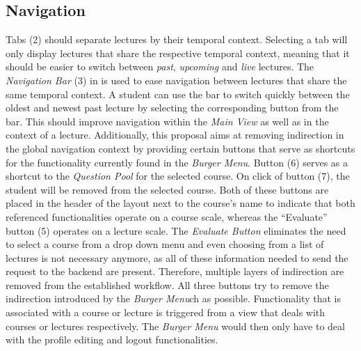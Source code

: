 \subsection{Navigation}
\label{section:con:proposals:mainview:navigation}
Tabs (2) should separate lectures by their temporal context. Selecting a tab will only display lectures that share the respective temporal context, meaning that it should be easier to switch between \emph{past}, \emph{upcoming} and \emph{live} lectures.
The \emph{Navigation Bar} (3) in  is used to ease navigation between lectures that share the same temporal context. A student can use the bar to switch quickly between the oldest and newest past lecture by selecting the corresponding button from the bar. This should improve navigation within the \emph{Main View} as well as in the context of a lecture. 
Additionally, this proposal aims at removing indirection in the global navigation context by providing certain buttons that serve as shortcuts for the functionality currently found in the \emph{Burger Menu}. Button (6) serves as a shortcut to the \emph{Question Pool} for the selected course. On click of button (7), the student will be removed from the selected course. Both of these buttons are placed in the header of the layout next to the course’s name to indicate that both referenced functionalities operate on a course scale, whereas the “Evaluate” button (5) operates on a lecture scale. The \emph{Evaluate Button} eliminates the need to select a course from a drop down menu and even choosing from a list of lectures is not necessary anymore, as all of these information needed to send the request to the backend are present. Therefore, multiple layers of indirection are removed from the established workflow. All three buttons try to remove the indirection introduced by the \emph{Burger Menu}ch as possible. Functionality that is associated with a course or lecture is triggered from a view that deals with courses or lectures respectively. The \emph{Burger Menu} would then only have to deal with the profile editing and logout functionalities.

